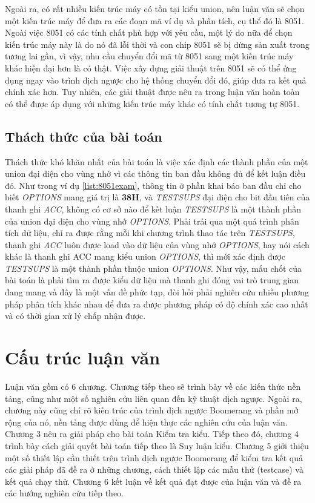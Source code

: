 Ngoài ra, có rất nhiều kiến trúc máy có tồn tại kiểu union, nên luận văn sẽ chọn một kiến trúc máy để đưa ra các đoạn mã ví dụ và phân tích, cụ thể đó là 8051. Ngoài việc 8051 có các tính chất phù hợp với yêu cầu, một lý do nữa để chọn kiến trúc máy này là do nó đã lỗi thời và con chip 8051 sẽ bị dừng sản xuất trong tương lai gần, vì vậy, nhu cầu chuyển đổi mã từ 8051 sang một kiến trúc máy khác hiện đại hơn là có thật. Việc xây dựng giải thuật trên 8051 sẽ có thể ứng dụng ngay vào trình dịch ngược cho hệ thống chuyển đổi đó, giúp đưa ra kết quả chính xác hơn. Tuy nhiên, các giải thuật được nêu ra trong luận văn hoàn toàn có thể được áp dụng với những kiến trúc máy khác có tính chất tương tự 8051.

\subsection{Thách thức của bài toán}
\label{sec:challenge}
Thách thức khó khăn nhất của bài toán là việc xác định các thành phần của một union đại diện cho vùng nhớ vì các thông tin ban đầu không đủ để kết luận điều đó. Như trong ví dụ \ref{list:8051exam}, thông tin ở phần khai báo ban đầu chỉ cho biết \textit{OPTIONS} mang giá trị là \textbf{38H}, và \textit{TESTSUPS} đại diện cho bit đầu tiên của thanh ghi \textit{ACC}, không có cơ sở nào để kết luận \textit{TESTSUPS} là một thành phần của union đại diện cho vùng nhớ \textit{OPTIONS}. Phải trải qua một quá trình phân tích dữ liệu, chỉ ra được rằng mỗi khi chương trình thao tác trên \textit{TESTSUPS}, thanh ghi \textit{ACC} luôn được load vào dữ liệu của vùng nhớ \textit{OPTIONS}, hay nói cách khác là thanh ghi ACC mang kiểu union \textit{OPTIONS}, thì mới xác định được \textit{TESTSUPS} là một thành phần thuộc union \textit{OPTIONS}. Như vậy, mấu chốt của bài toán là phải tìm ra được kiểu dữ liệu mà thanh ghi đóng vai trò trung gian đang mang và đây là một vấn đề phức tạp, đòi hỏi phải nghiên cứu nhiều phương pháp phân tích khác nhau để đưa ra được phương pháp có độ chính xác cao nhất và có thời gian xử lý chấp nhận được.


\section{Cấu trúc luận văn}

Luận văn gồm có 6 chương. Chương tiếp theo sẽ trình bày về các kiến thức nền tảng, cũng như một số nghiên cứu liên quan đến kỹ thuật dịch ngược. Ngoài ra, chương này cũng chỉ rõ kiến trúc của trình dịch ngược Boomerang và phần mở rộng của nó, nền tảng được dùng để hiện thực các nghiên cứu của luận văn. Chương 3 nêu ra giải pháp cho bài toán Kiểm tra kiểu. Tiếp theo đó, chương 4 trình bày cách giải quyết bài toán tiếp theo là Suy luận kiểu. Chương 5 giới thiệu một số thiết lập cần thiết trên trình dịch ngược Boomerang để kiểm tra kết quả các giải pháp đã đề ra ở những chương, cách thiết lập các mẫu thử (testcase) và kết quả chạy thử. Chương 6 kết luận về kết quả đạt được của luận văn và đề ra các hướng nghiên cứu tiếp theo.
	
